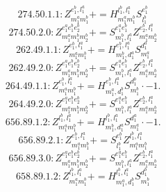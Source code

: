 \documentclass[letterpaper,10pt,fleqn,leqno,onecolumn]{article}
\begin{document}
\begin{equation} \;\;\;\;\;\;  274.50.1.1: Z^{e_{1}^{b},l_{1}^{a}}_{m_{1}^{a}m_{1}^{b}}+=H^{l_{1}^{b},l_{1}^{a}}_{m_{1}^{a}m_{1}^{b}}S^{e_{1}^{b}}_{l_{1}^{b}} \end{equation}
\begin{equation} \;\;\;\;\;\;  274.50.2.0: Z^{e_{1}^{a}e_{1}^{b}e_{2}^{b}}_{m_{1}^{a}m_{1}^{b}m_{2}^{b}}+=S^{e_{1}^{a}e_{1}^{b}}_{m_{1}^{b},l_{1}^{a}}Z^{e_{2}^{b},l_{1}^{a}}_{m_{1}^{a}m_{2}^{b}} \end{equation}
\begin{equation} \;\;\;\;\;\;  262.49.1.1: Z^{e_{1}^{b},l_{1}^{a}}_{m_{1}^{a}m_{1}^{b}}+=H^{e_{1}^{b},l_{1}^{a}}_{m_{1}^{b},d_{1}^{a}}S^{d_{1}^{a}}_{m_{1}^{a}} \end{equation}
\begin{equation} \;\;\;\;\;\;  262.49.2.0: Z^{e_{1}^{a}e_{1}^{b}e_{2}^{b}}_{m_{1}^{a}m_{1}^{b}m_{2}^{b}}+=S^{e_{1}^{a}e_{1}^{b}}_{m_{1}^{b},l_{1}^{a}}Z^{e_{2}^{b},l_{1}^{a}}_{m_{1}^{a}m_{2}^{b}} \end{equation}
\begin{equation} \;\;\;\;\;\;  264.49.1.1: Z^{e_{1}^{b},l_{1}^{a}}_{m_{1}^{a}m_{1}^{b}}+=H^{e_{1}^{b},l_{1}^{a}}_{m_{1}^{a},d_{1}^{b}}S^{d_{1}^{b}}_{m_{1}^{b}}\cdot -1. \end{equation}
\begin{equation} \;\;\;\;\;\;  264.49.2.0: Z^{e_{1}^{a}e_{1}^{b}e_{2}^{b}}_{m_{1}^{a}m_{1}^{b}m_{2}^{b}}+=S^{e_{1}^{a}e_{1}^{b}}_{m_{1}^{b},l_{1}^{a}}Z^{e_{2}^{b},l_{1}^{a}}_{m_{1}^{a}m_{2}^{b}} \end{equation}
\begin{equation} \;\;\;\;\;\;  656.89.1.2: Z^{l_{1}^{b},l_{1}^{a}}_{m_{1}^{a}m_{1}^{b}}+=H^{l_{1}^{b},l_{1}^{a}}_{m_{1}^{b},d_{1}^{a}}S^{d_{1}^{a}}_{m_{1}^{a}}\cdot -1. \end{equation}
\begin{equation} \;\;\;\;\;\;  656.89.2.1: Z^{e_{1}^{b},l_{1}^{a}}_{m_{1}^{a}m_{1}^{b}}+=S^{e_{1}^{b}}_{l_{1}^{b}}Z^{l_{1}^{b},l_{1}^{a}}_{m_{1}^{a}m_{1}^{b}} \end{equation}
\begin{equation} \;\;\;\;\;\;  656.89.3.0: Z^{e_{1}^{a}e_{1}^{b}e_{2}^{b}}_{m_{1}^{a}m_{1}^{b}m_{2}^{b}}+=S^{e_{1}^{a}e_{1}^{b}}_{m_{1}^{b},l_{1}^{a}}Z^{e_{2}^{b},l_{1}^{a}}_{m_{1}^{a}m_{2}^{b}} \end{equation}
\begin{equation} \;\;\;\;\;\;  658.89.1.2: Z^{l_{1}^{b},l_{1}^{a}}_{m_{1}^{a}m_{1}^{b}}+=H^{l_{1}^{b},l_{1}^{a}}_{m_{1}^{a},d_{1}^{b}}S^{d_{1}^{b}}_{m_{1}^{b}} \end{equation}
\end{document}
